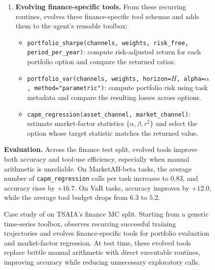 \begin{figure}[h]
{\begin{tcolorbox}
\begin{enumerate}
    \item \textbf{Evolving finance-specific tools.}
    From these recurring routines, \method{} evolves three finance-specific
    tool schemas and adds them to the agent's reusable toolbox:
    \vspace{-1mm}
    \begin{itemize}\setlength\itemsep{0pt}
      \item \texttt{portfolio\_sharpe(channels, weights, risk\_free, period\_per\_year)}: compute risk-adjusted return for each
        portfolio option and compare the returned ratios.
      \item \texttt{portfolio\_var(channels, weights, horizon=$H$, alpha=$\alpha$, method="parametric")}: compute portfolio risk using task metadata and compare the resulting losses across options.
      \item \texttt{capm\_regression(asset\_channel, market\_channel)}: estimate market-factor statistics $\{\alpha,\beta,r^{2}\}$ and select the option whose target statistic matches the returned value.
    \end{itemize}
\end{enumerate}
\textbf{Evaluation.}
Across the finance test split, evolved tools improve both accuracy and tool-use efficiency, especially when manual arithmetic is unreliable. On {MarketAB-beta} tasks, the average number of \texttt{capm\_regression} calls per task increases to $0.83$, and accuracy rises by $+16.7$. On {VaR} tasks, accuracy improves by $+12.0$, while the average tool budget drops from $6.3$ to $5.2$.

\end{tcolorbox}}
\caption{
Case study of \method{} on TSAIA's finance MC split. 
Starting from a generic time-series toolbox, \method{} observes recurring
successful training trajectories and evolves finance-specific tools for
portfolio evaluation and market-factor regression. 
At test time, these evolved tools replace brittle manual arithmetic with
direct executable routines, improving accuracy while reducing unnecessary
exploratory calls. 
}
\label{fig:tsaia_case_study_finance_tools}
\end{figure}












\clearpage

